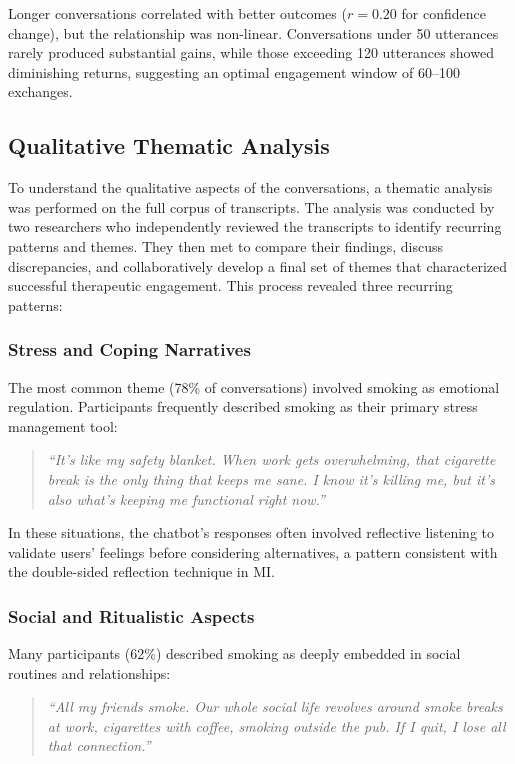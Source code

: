 Longer conversations correlated with better outcomes ($r=0.20$ for confidence change), but the relationship was non-linear. Conversations under 50 utterances rarely produced substantial gains, while those exceeding 120 utterances showed diminishing returns, suggesting an optimal engagement window of 60--100 exchanges.

\subsection*{Qualitative Thematic Analysis}

To understand the qualitative aspects of the conversations, a thematic analysis was performed on the full corpus of transcripts. The analysis was conducted by two researchers who independently reviewed the transcripts to identify recurring patterns and themes. They then met to compare their findings, discuss discrepancies, and collaboratively develop a final set of themes that characterized successful therapeutic engagement. This process revealed three recurring patterns:

\subsubsection*{Stress and Coping Narratives}

The most common theme (78\% of conversations) involved smoking as emotional regulation. Participants frequently described smoking as their primary stress management tool:

\begin{quote}
	\textit{``It's like my safety blanket. When work gets overwhelming, that cigarette break is the only thing that keeps me sane. I know it's killing me, but it's also what's keeping me functional right now.''}
\end{quote}

In these situations, the chatbot's responses often involved reflective listening to validate users' feelings before considering alternatives, a pattern consistent with the double-sided reflection technique in MI.

\subsubsection*{Social and Ritualistic Aspects}

Many participants (62\%) described smoking as deeply embedded in social routines and relationships:

\begin{quote}
	\textit{``All my friends smoke. Our whole social life revolves around smoke breaks at work, cigarettes with coffee, smoking outside the pub. If I quit, I lose all that connection.''}
\end{quote}

